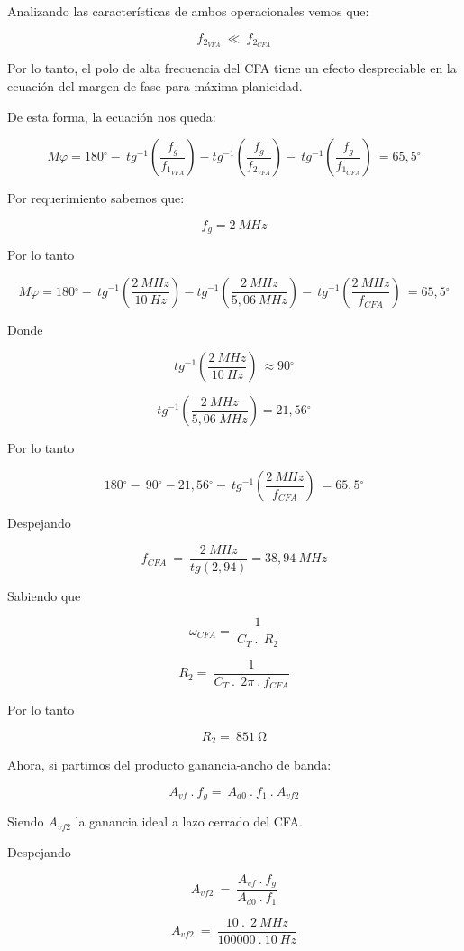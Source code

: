 \documentclass[12pt,a4paper]{article}
\begin{document}
Analizando las características de ambos operacionales vemos que:

\[f_{2_{VFA}}\  \ll \ f_{2_{CFA}}\]

Por lo tanto, el polo de alta frecuencia del CFA tiene un efecto
despreciable en la ecuación del margen de fase para máxima planicidad.

De esta forma, la ecuación nos queda:

\[M\varphi = 180{^\circ} - \ {tg}^{- 1}\left( \frac{f_{g}}{f_{1_{VFA}}} \right) - {tg}^{- 1}\left( \frac{f_{g}}{f_{2_{VFA}}} \right) - \ {tg}^{- 1}\left( \frac{f_{g}}{f_{1_{CFA}}} \right)\  = 65,5{^\circ}\]

Por requerimiento sabemos que:

\[f_{g} = 2\ MHz\]

Por lo tanto

\[M\varphi = 180{^\circ} - \ {tg}^{- 1}\left( \frac{2\ MHz}{10\ Hz} \right) - {tg}^{- 1}\left( \frac{2\ MHz}{5,06\ MHz} \right) - \ {tg}^{- 1}\left( \frac{2\ MHz}{f_{CFA}} \right)\  = 65,5{^\circ}\]

Donde

\[{tg}^{- 1}\left( \frac{2\ MHz}{10\ Hz} \right)\  \approx 90{^\circ}\]

\[{tg}^{- 1}\left( \frac{2\ MHz}{5,06\ MHz} \right) = 21,56{^\circ}\]

Por lo tanto

\[180{^\circ} - \ 90{^\circ} - 21,56{^\circ} - \ {tg}^{- 1}\left( \frac{2\ MHz}{f_{CFA}} \right)\  = 65,5{^\circ}\]

Despejando

\[f_{CFA}\  = \ \frac{2\ MHz}{tg(2,94)} = 38,94\ MHz\]

Sabiendo que

\[\omega_{CFA} = \ \frac{1}{C_{T}\ .\ \ R_{2}}\]

\[R_{2} = \ \frac{1}{C_{T}\ .\ \ 2\pi\ .\ f_{CFA}}\]

Por lo tanto

\[R_{2} = \ 851\ \mathrm{\Omega}\]

Ahora, si partimos del producto ganancia-ancho de banda:

\[A_{vf}\ .\ f_{g} = \ A_{d0}\ .\ f_{1}\ .\ A_{vf2}\]

Siendo \(A_{vf2}\) la ganancia ideal a lazo cerrado del CFA.

Despejando

\[A_{vf2}\  = \ \frac{A_{vf}\ .\ f_{g}}{A_{d0}\ .\ f_{1}}\]

\[A_{vf2}\  = \ \frac{10\ .\ \ 2\ MHz}{100000\ .\ 10\ Hz}\]
\end{document}
